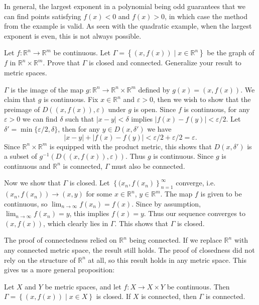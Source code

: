 \documentclass[10pt]{amsart}
\newenvironment{exercise}[1]{%
	\vspace{10mm}
	\renewcommand\themanualtheoreminner{#1}%
  \manualtheoreminner
}\hrulefill{\endmanualtheoreminner}
\begin{document}
In general, the largest exponent in a polynomial being odd guarantees that we can find points satisfying $f(x) < 0$ and $f(x) > 0$, in which case the method from the example is valid. As seen with the quadratic example, when the largest exponent is even, this is not always possible.

\begin{exercise}{Page 193, 4.5.2}
	Let $f:\mathbb{R}^n\to \mathbb{R}^m$ be continuous. Let $\Gamma = \left\{ (x,f(x)) \;|\; x \in \mathbb{R}^n \right\}$ be the graph of $f$ in $\mathbb{R}^n \times \mathbb{R}^m$. Prove that $\Gamma$ is closed and connected. Generalize your result to metric spaces.
\end{exercise}

$\Gamma$ is the image of the map $g:\mathbb{R}^n \to \mathbb{R}^n \times \mathbb{R}^m$ defined by $g(x) = (x,f(x))$. We claim that $g$ is continuous. Fix $x \in \mathbb{R}^n$ and $\varepsilon>0$, then we wish to show that the preimage of $D( (x,f(x)), \varepsilon)$ under $g$ is open. Since $f$ is continuous, for any $\varepsilon>0$ we can find $\delta$ such that $|x-y|<\delta$ implies $|f(x)-f(y)|<\varepsilon/2$. Let $\delta'= \min\{\varepsilon/2, \delta\}$, then for any $y \in D(x,\delta')$ we have
\[
        |x-y| + |f(x) -f(y)| < \varepsilon/2 + \varepsilon/2 = \varepsilon.
\] Since $\mathbb{R}^n \times \mathbb{R}^m$ is equipped with the product metric, this shows that $D(x,\delta')$ is a subset of $g^{-1}\left(D( (x,f(x)), \varepsilon) \right)$. Thus $g$ is continuous. Since $g$ is continuous and $\mathbb{R}^n$ is connected, $\Gamma$ must also be connected.

Now we show that $\Gamma$ is closed. Let $\left\{ (x_n,f(x_n) \right\}_{n=1}^\infty$ converge, i.e. $(x_n, f(x_n)) \to (x,y)$ for some $x \in \mathbb{R}^n$, $y \in \mathbb{R}^m$. The map $f$ is given to be continuous, so $\lim_{n \to \infty} f(x_n) = f(x)$. Since by assumption, $\lim_{n \to \infty} f(x_n)=y$, this implies $f(x) = y$. Thus our sequence converges to $(x,f(x))$, which clearly lies in $\Gamma$. This shows that $\Gamma$ is closed.

The proof of connectedness relied on $\mathbb{R}^n$ being connected. If we replace $\mathbb{R}^n$ with any connected metric space, the result still holds. The proof of closedness did not rely on the structure of $\mathbb{R}^n$ at all, so this result holds in any metric space. This gives us a more general proposition:

Let $X$ and $Y$ be metric spaces, and let $f:X \to X \times Y$ be continuous. Then $\Gamma = \left\{ (x,f(x)) \;|\; x \in X \right\}$ is closed. If $X$ is connected, then $\Gamma$ is connected.
\end{document}
